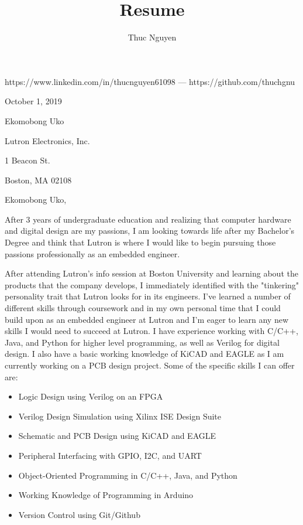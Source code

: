 \documentclass{article}
\renewcommand{\maketitle}
{\begin{center}
{\huge\bfseries\theauthor}
\vspace{.5em}

https://www.linkedin.com/in/thucnguyen61098 --- https://github.com/thuchgnu

\end{center}}
\begin{document}
\title{Resume}
\author{Thuc Nguyen}
\maketitle
\vspace{-.5em}

\begin{flushleft}
\vspace{1.6em}

October 1, 2019

\vspace{1.6em}
Ekomobong Uko

Lutron Electronics, Inc.

1 Beacon St.

Boston, MA 02108

\end{flushleft}
\vspace{1.6em}
Ekomobong Uko,

\vspace{1em}
After 3 years of undergraduate education and realizing that computer hardware and digital design are my passions, I am looking towards life after my Bachelor's Degree and think that Lutron is where I would like to begin pursuing those passions professionally as an embedded engineer.

\vspace{.6em}
After attending Lutron's info session at Boston University and learning about the products that the company develops, I immediately identified with the "tinkering" personality trait that Lutron looks for in its engineers. I've learned a number of different skills through coursework and in my own personal time that I could build upon as an embedded engineer at Lutron and I'm eager to learn any new skills I would need to succeed at Lutron. I have experience working with C/C++, Java, and Python for higher level programming, as well as Verilog for digital design. I also have a basic working knowledge of KiCAD and EAGLE as I am currently working on a PCB design project. Some of the specific skills I can offer are:

\begin{itemize}
  \item{Logic Design using Verilog on an FPGA}
  \item{Verilog Design Simulation using Xilinx ISE Design Suite}
  \item{Schematic and PCB Design using KiCAD and EAGLE}
  \item{Peripheral Interfacing with GPIO, I2C, and UART}
  \item{Object-Oriented Programming in C/C++, Java, and Python}
  \item{Working Knowledge of Programming in Arduino}
  \item{Version Control using Git/Github}
\end{itemize}
\end{document}

